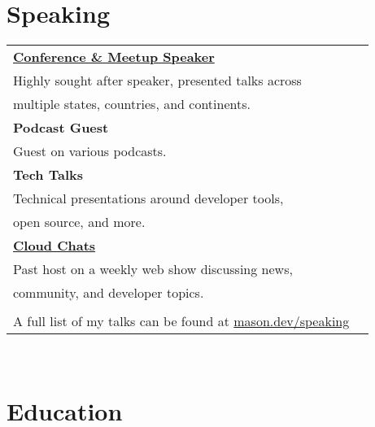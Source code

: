 \documentclass[10pt]{article} %
\newcommand\tab[1][1cm]{\hspace*{#1}}
\begin{document}
\begin{minipage}[t]{0.44\textwidth} %
\vspace{0pt} %


\section{Speaking} 

\begin{tabular}{ll}

\textbf{\href{https://mason.dev/speaking}{Conference \& Meetup Speaker}} \\
\tab Highly sought after speaker, presented talks across \\ 
\tab multiple states, countries, and continents. \\

\textbf{Podcast Guest} \\
\tab Guest on various podcasts. \\

\textbf{Tech Talks} \\
\tab Technical presentations around developer tools, \\
\tab open source, and more. \\


\textbf{\href{https://www.digitalocean.com/community/pages/cloud-chats}{Cloud Chats}} \\
\tab Past host on a weekly web show discussing news, \\
\tab community, and developer topics.\\
\\

A full list of my talks can be found at \href{https://mason.dev/speaking}{mason.dev/speaking}\\

\end{tabular}\\



\section{Education} 


\end{minipage}
\end{document}
